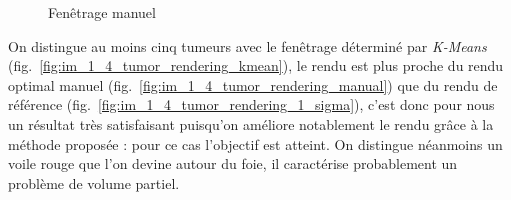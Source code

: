 	\begin{figure}[!ht]	%
	  \centering
			\hspace{1em}
		\caption{Fenêtrage manuel}
		\label{fig:tumor_windowing}
	\end{figure}
		
	On distingue au moins cinq tumeurs avec le fenêtrage déterminé par \emph{K-Means} (fig.~\ref{fig:im_1_4_tumor_rendering_kmean}), le rendu est plus proche du rendu optimal manuel (fig.~\ref{fig:im_1_4_tumor_rendering_manual}) que du rendu de référence (fig.~\ref{fig:im_1_4_tumor_rendering_1_sigma}), c'est donc pour nous un résultat très satisfaisant puisqu'on améliore notablement le rendu grâce à la méthode proposée : pour ce cas l'objectif est atteint. On distingue néanmoins un voile rouge que l'on devine autour du foie, il caractérise probablement un problème de volume partiel.

